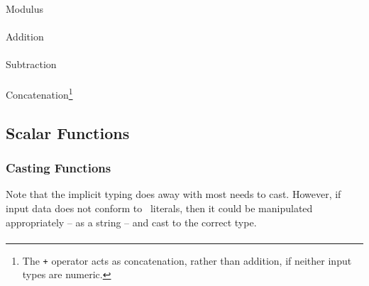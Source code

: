 \paragraph{} Modulus
\paragraph{} Addition
\paragraph{} Subtraction

\paragraph{} Concatenation\footnote{The
\texttt{+} operator acts as concatenation, rather than addition, if
neither input types are numeric.}

\subsection{Scalar Functions}

\subsubsection{Casting Functions}

Note that the implicit typing does away with most needs to cast.
However, if input data does not conform to \stag\ literals, then it
could be manipulated appropriately -- as a string -- and cast to the
correct type.

\paragraph{}
\paragraph{}
\paragraph{}
\paragraph{}


